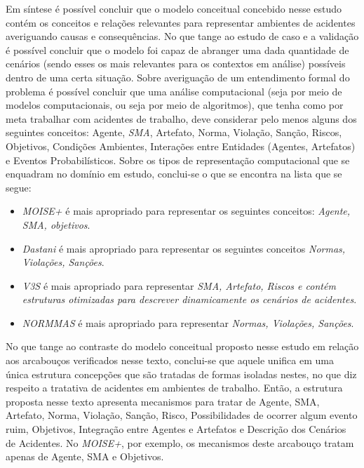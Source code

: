 Em síntese é possível concluir que o modelo conceitual concebido nesse estudo contém os conceitos e relações relevantes para representar ambientes de acidentes averiguando causas e consequências. No que tange ao estudo de caso e a validação é possível concluir que o modelo foi capaz de abranger uma dada quantidade de cenários (sendo esses os mais relevantes para os contextos em análise) possíveis dentro de uma certa situação. Sobre averiguação de um entendimento formal do problema é possível concluir que uma análise computacional (seja por meio de modelos computacionais, ou seja por meio de algoritmos), que tenha como por meta trabalhar com acidentes de trabalho, deve considerar pelo menos alguns dos seguintes conceitos: Agente, \textit{SMA}, Artefato, Norma, Violação, Sanção, Riscos, Objetivos, Condições Ambientes, Interações entre Entidades (Agentes, Artefatos) e Eventos Probabilísticos. Sobre os tipos de representação computacional que se enquadram no domínio em estudo, conclui-se o que se encontra na lista que se segue:
\begin{itemize}
    \item \textit{MOISE+} é mais apropriado para representar os seguintes conceitos: \textit{Agente, SMA, objetivos}.
    \item \textit{Dastani} é mais apropriado para representar os seguintes conceitos \textit{Normas, Violações, Sanções}.
    \item \textit{V3S} é mais apropriado para representar \textit{SMA, Artefato, Riscos e contém estruturas otimizadas para descrever dinamicamente os cenários de acidentes}.
    \item \textit{NORMMAS} é mais apropriado para representar \textit{Normas, Violações, Sanções}.
\end{itemize}

No que tange ao contraste do modelo conceitual proposto nesse estudo em relação aos arcabouços verificados nesse texto, conclui-se que aquele unifica em uma única estrutura concepções que são tratadas de formas isoladas nestes, no que diz respeito a tratativa de acidentes em ambientes de trabalho. Então, a estrutura proposta nesse texto apresenta mecanismos para tratar de Agente, SMA, Artefato, Norma, Violação, Sanção, Risco, Possibilidades de ocorrer algum evento ruim, Objetivos, Integração entre Agentes e Artefatos e Descrição dos Cenários de Acidentes. No \textit{MOISE+}, por exemplo, os mecanismos deste arcabouço tratam apenas de Agente, SMA e Objetivos.